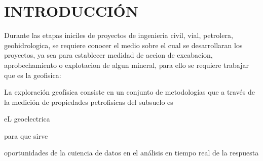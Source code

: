 \chapter{INTRODUCCIÓN}
Durante las etapas iniciles de proyectos de ingenieria civil, vial, petrolera, geohidrologica, se requiere conocer el medio sobre el cual se desarrollaran los proyectos, ya sea para establecer medidad de accion de excabacion, aprobechamiento o explotacion de algun mineral, para ello se requiere trabajar 
que es la geofisica:

La exploración geofísica consiste en un conjunto de metodologías que a través de la medición de propiedades petrofisicas del subsuelo es 

eL geoelectrica

para que sirve


oportunidades de la cuiencia de datos en el análisis en tiempo real de la respuesta 




